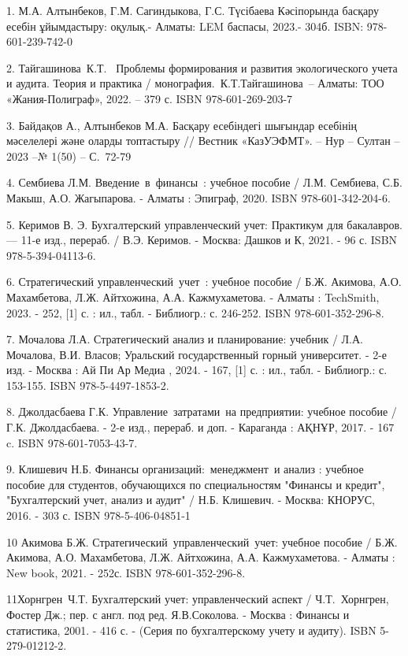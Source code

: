 \begin{references}

1. М.А. Алтынбеков, Г.М. Сагиндыкова, Г.С. Түсібаева Кәсіпорында басқару
есебін ұйымдастыру: оқулық.- Алматы: LEM баспасы, 2023.- 304б. ISBN:
978-601-239-742-0

2. Тайгашинова~К.Т.~ Проблемы формирования и развития экологического
учета и аудита. Теория и практика / монография.~К.Т.Тайгашинова~--
Алматы: ТОО «Жания-Полиграф», 2022. -- 379 с. ISBN 978-601-269-203-7

3. Байдақов А., Алтынбеков М.А. Басқару есебіндегі шығындар есебінің
мәселелері және оларды топтастыру // Вестник «КазУЭФМТ». -- Нур --
Султан -- 2023 --№ 1(50) -- С.~72-79

4. Сембиева Л.М. Введение~в~финансы~: учебное пособие / Л.М. Сембиева,
С.Б. Макыш, А.О. Жагыпарова. - Алматы : Эпиграф, 2020. ISBN
978-601-342-204-6.

5. Керимов В. Э. Бухгалтерский управленческий учет: Практикум для
бакалавров. --- 11-е изд., перераб. / В.Э. Керимов. - Москва: Дашков и
К, 2021. - 96 с. ISBN 978-5-394-04113-6.~

6. Стратегический управленческий~учет~: учебное пособие / Б.Ж. Акимова,
А.О. Махамбетова, Л.Ж. Айтхожина, А.А. Кажмухаметова. - Алматы :
TechSmith, 2023. - 252, {[}1{]} с. : ил., табл. - Библиогр.: с. 246-252.
ISBN 978-601-352-296-8.~

7. Мочалова Л.А. Стратегический анализ и планирование: учебник / Л.А.
Мочалова, В.И. Власов; Уральский государственный горный университет. -
2-е изд. - Москва : Ай Пи Ар Медиа , 2024. - 167, {[}1{]} с. : ил.,
табл. - Библиогр.: с. 153-155. ISBN 978-5-4497-1853-2.

8. Джолдасбаева Г.К. Управление~затратами~на предприятии: учебное
пособие / Г.К. Джолдасбаева. - 2-е изд., перераб. и доп. - Караганда :
АҚНҰР, 2017. - 167 c. ISBN 978-601-7053-43-7.

9. Клишевич Н.Б. Финансы организаций:~менеджмент~и анализ : учебное
пособие для студентов, обучающихся по специальностям "Финансы и кредит",
"Бухгалтерский учет, анализ и аудит" / Н.Б. Клишевич. - Москва: КНОРУС,
2016. - 303 с. ISBN 978-5-406-04851-1

10 Акимова Б.Ж. Стратегический~управленческий~учет: учебное пособие /
Б.Ж. Акимова, А.О. Махамбетова, Л.Ж. Айтхожина, А.А. Кажмухаметова. -
Алматы : New book, 2021. - 252с. ISBN 978-601-352-296-8.

11Хорнгрен~Ч.Т. Бухгалтерский учет: управленческий аспект /
Ч.Т.~Хорнгрен, Фостер Дж.; пер. с англ. под ред. Я.В.Соколова. - Москва
: Финансы и статистика, 2001. - 416 с. - (Серия по бухгалтерскому учету
и аудиту). ISBN 5-279-01212-2.


\end{references}
